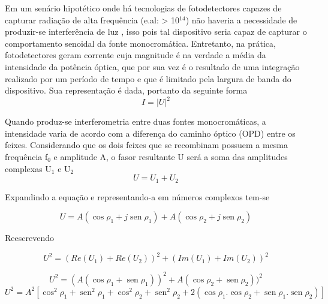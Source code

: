\documentclass[oneside,openright,12pt]{ufsm_2021} %
\renewcommand{\sin}{\operatorname{sen}}
\begin{document}
    \par Em um senário hipotético onde há tecnologias de fotodetectores capazes de capturar radiação de alta frequência (e.al: > 10$^{14}$) não haveria a necessidade de produzir-se interferência de luz \cite{LivroFT}, isso pois tal dispositivo seria capaz de capturar o comportamento senoidal da fonte monocromática. Entretanto, na prática, fotodetectores geram corrente cuja magnitude é na verdade a média da intensidade da potência óptica, que por sua vez é o resultado de uma integração realizado por um período de tempo e que é limitado pela largura de banda do dispositivo. Sua representação é dada, portanto da seguinte forma
        \begin{equation}
            I={|U|}^2
        \end{equation}

    \par Quando produz-se interferometria entre duas fontes monocromáticas, a intensidade varia de acordo com a diferença do caminho óptico (OPD) entre os feixes. Considerando que os dois feixes que se recombinam possuem a mesma frequência f$_0$ e amplitude A, o fasor resultante U será a soma das amplitudes complexas U$_1$ e U$_2$
        \begin{equation}
            U = U_1 + U_2
        \end{equation}

    \par Expandindo a equação e representando-a em números complexos tem-se

        \begin{equation}
            U = A(\cos \rho_1 + j\sin \rho_1) + A(\cos \rho_2 + j\sin \rho_2)
        \end{equation}

    \par Reescrevendo

        \begin{equation}
            U^2 = (Re(U_1) + Re(U_2))^2 + (Im(U_1) + Im(U_2))^2
        \end{equation}

    \begin{equation}
        U^2 = (A(\cos \rho_1 + \sin \rho_1))^2 + A(\cos \rho_2 + \sin \rho_2))^2 
    \end{equation}    
    \begin{equation}
    U^2 = A^2[\cos^2 \rho_1 + \sin^2 \rho_1 + \cos^2 \rho_2 + \sin^2 \rho_2 + 2(\cos \rho_1.\cos \rho_2 + \sin \rho_1.\sin \rho_2)] 
    \end{equation}
\end{document}
